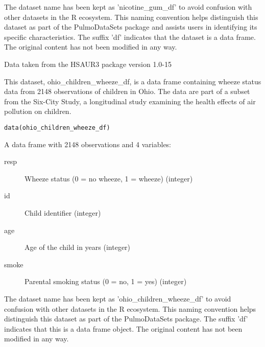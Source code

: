 \documentclass[a4paper]{book}
\begin{document}
%
\begin{Details}
The dataset name has been kept as 'nicotine\_gum\_df' to avoid confusion with other datasets
in the R ecosystem. This naming convention helps distinguish this dataset as part of the
PulmoDataSets package and assists users in identifying its specific characteristics.
The suffix 'df' indicates that the dataset is a data frame. The original content
has not been modified in any way.
\end{Details}
%
\begin{Source}
Data taken from the HSAUR3 package version 1.0-15
\end{Source}
%
\begin{Description}
This dataset, ohio\_children\_wheeze\_df, is a data frame containing wheeze status data
from 2148 observations of children in Ohio. The data are part of a subset from the Six-City Study,
a longitudinal study examining the health effects of air pollution on children.
\end{Description}
%
\begin{Usage}
\begin{verbatim}
data(ohio_children_wheeze_df)
\end{verbatim}
\end{Usage}
%
\begin{Format}
A data frame with 2148 observations and 4 variables:
\begin{description}

\item[resp] Wheeze status (0 = no wheeze, 1 = wheeze) (integer)
\item[id] Child identifier (integer)
\item[age] Age of the child in years (integer)
\item[smoke] Parental smoking status (0 = no, 1 = yes) (integer)

\end{description}

\end{Format}
%
\begin{Details}
The dataset name has been kept as 'ohio\_children\_wheeze\_df' to avoid confusion
with other datasets in the R ecosystem. This naming convention helps distinguish
this dataset as part of the PulmoDataSets package. The suffix 'df' indicates
that this is a data frame object. The original content has not been modified
in any way.
\end{Details}
\end{document}

